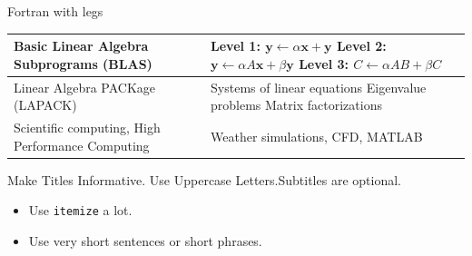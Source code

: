 \documentclass{beamer}
\begin{document}
\begin{frame}{Fortran with legs}
    \begin{tabulary}{\textwidth}{|L|L|}
        \hline
        Basic Linear Algebra Subprograms (BLAS) &
        Level 1: \(\bm{y} \leftarrow \alpha \bm{x} + \bm{y}\) \newline
        Level 2: \(\bm{y} \leftarrow \alpha {A} \bm{x} + \beta \bm{y}\) \newline
        Level 3: \({C} \leftarrow \alpha {AB} + \beta {C}\) \\
        \hline

        Linear Algebra PACKage (LAPACK) &
        Systems of linear equations \newline
        Eigenvalue problems \newline
        Matrix factorizations \\
        \hline

        Scientific computing, 
        High Performance Computing &
        Weather simulations, CFD, MATLAB \\
        \hline

    \end{tabulary}
\end{frame}

\begin{frame}{Make Titles Informative. Use Uppercase Letters.}{Subtitles are optional.}

  \begin{itemize}
  \item
    Use \texttt{itemize} a lot.
  \item
    Use very short sentences or short phrases.
  \end{itemize}
\end{frame}
\end{document}
